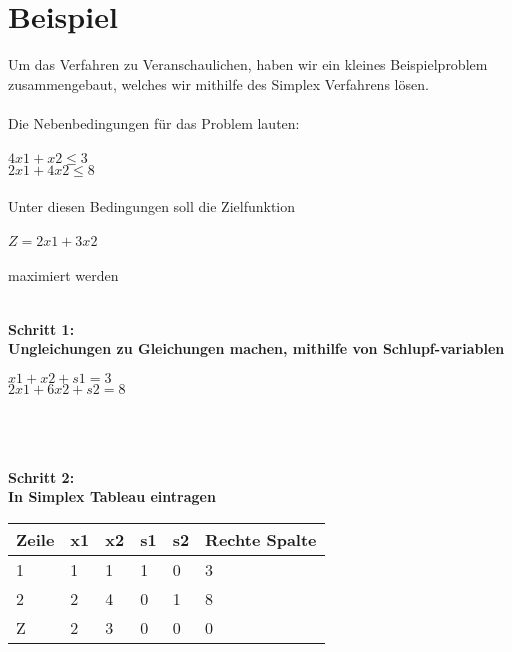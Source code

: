 \section{Beispiel}
Um das Verfahren zu Veranschaulichen, haben wir ein kleines Beispielproblem zusammengebaut, welches wir mithilfe des Simplex Verfahrens lösen.\\~\\
Die Nebenbedingungen für das Problem lauten:\\~\\
\(4x1+x2\le3\)\\
\(2x1+4x2\le8\)\\~\\
Unter diesen Bedingungen soll die Zielfunktion\\~\\
\(Z = 2x1+ 3x2\)\\~\\
maximiert werden\\
\\
\begin{center}
    
\textbf{Schritt 1: \\Ungleichungen zu Gleichungen machen, mithilfe von Schlupf-variablen }\end{center}

\(x1+x2+s1=3\)\\
\(2x1+6x2+s2=8\)\\~\\~\\~\\
\begin{center}
    
\textbf{Schritt 2:\\In Simplex Tableau eintragen}\\\end{center}
\begin{table}[h]
\begin{tabular}{|l|l|l|l|l|l|}
\hline
\rowcolor[HTML]{C0C0C0} 
Zeile                     & x1 & x2 & s1 & s2 & Rechte Spalte \\ \hline
\cellcolor[HTML]{C0C0C0}1 & 1  & 1  & 1  & 0  & 3             \\ \hline
\cellcolor[HTML]{C0C0C0}2 & 2  & 4  & 0  & 1  & 8             \\ \hline
\cellcolor[HTML]{C0C0C0}Z & 2  & 3  & 0  & 0  & 0             \\ \hline
\end{tabular}
\end{table}

